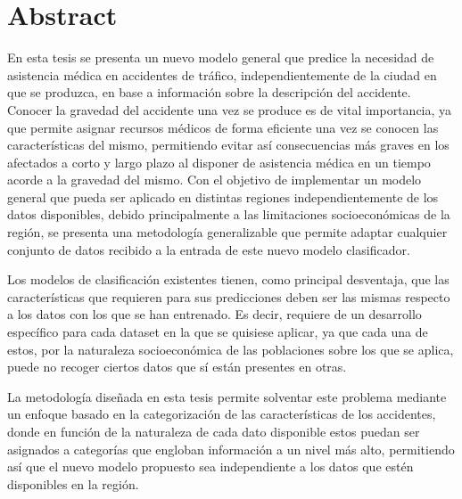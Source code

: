 \chapter*{Abstract}






En esta tesis se presenta un nuevo modelo general que predice la necesidad de asistencia médica en accidentes de tráfico, independientemente de la ciudad en que se produzca, en base a información sobre la descripción del accidente. Conocer la gravedad del accidente una vez se produce es de vital importancia, ya que permite asignar recursos médicos de forma eficiente una vez se conocen las características del mismo, permitiendo evitar así consecuencias más graves en los afectados a corto y largo plazo al disponer de asistencia médica en un tiempo acorde a la gravedad del mismo. Con el objetivo de implementar un modelo general que pueda ser aplicado en distintas regiones independientemente de los datos disponibles, debido principalmente a las limitaciones socioeconómicas de la región, se presenta una metodología generalizable que permite adaptar cualquier conjunto de datos recibido a la entrada de este nuevo modelo clasificador.

Los modelos de clasificación existentes tienen, como principal desventaja, que las características que requieren para sus predicciones deben ser las mismas respecto a los datos con los que se han entrenado. 
Es decir, requiere de un desarrollo específico para cada dataset en la que se quisiese aplicar, ya que cada una de estos, por la naturaleza socioeconómica de las poblaciones sobre los que se aplica, puede no recoger ciertos datos que sí están presentes en otras. 

La metodología diseñada en esta tesis permite solventar este problema mediante un enfoque basado en la categorización de las características de los accidentes, donde en función de la naturaleza de cada dato disponible estos puedan ser asignados a categorías que engloban información a un nivel más alto, permitiendo así que el nuevo modelo propuesto sea independiente a los datos que estén disponibles en la región.

